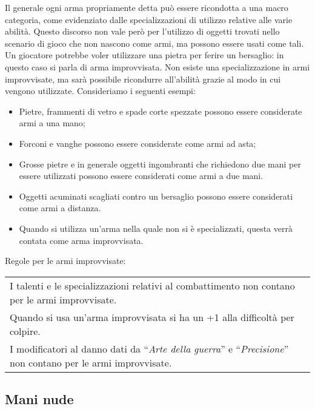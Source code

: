 \documentclass[../manuale_main.tex]{subfiles}
\begin{document}
Il generale ogni arma propriamente detta può essere ricondotta a una macro categoria, come evidenziato dalle specializzazioni di utilizzo relative alle varie abilità.
Questo discorso non vale però per l'utilizzo di oggetti trovati nello scenario di gioco che non nascono come armi, ma possono essere usati come tali. Un giocatore potrebbe voler utilizzare una pietra per ferire un bersaglio: in questo caso si parla di arma improvvisata.
Non esiste una specializzazione in armi improvvisate, ma sarà possibile ricondurre all'abilità grazie al modo in cui vengono utilizzate. Consideriamo i seguenti esempi:
\begin{itemize}
\item Pietre, frammenti di vetro e spade corte spezzate possono essere considerate armi a una mano;
\item Forconi e vanghe possono essere considerate come armi ad asta;
\item Grosse pietre e in generale oggetti ingombranti che richiedono due mani per essere utilizzati possono essere considerati come armi a due mani.
\item Oggetti acuminati scagliati contro un bersaglio possono essere considerati come armi a distanza.
\item Quando si utilizza un'arma nella quale non si è specializzati, questa verrà contata come arma improvvisata.
\end{itemize}
Regole per le armi improvvisate:\\
\renewcommand{\arraystretch}{1.5}
\begin{tabularx}{\linewidth}{X}
I talenti e le specializzazioni relativi al combattimento non contano per le armi improvvisate.\\
Quando si usa un'arma improvvisata si ha un +1 alla difficoltà per colpire.\\
I modificatori al danno dati da “\emph{Arte della guerra}” e “\emph{Precisione}” non contano per le armi improvvisate.\\
\end{tabularx}

\subsection{Mani nude}
\end{document}
